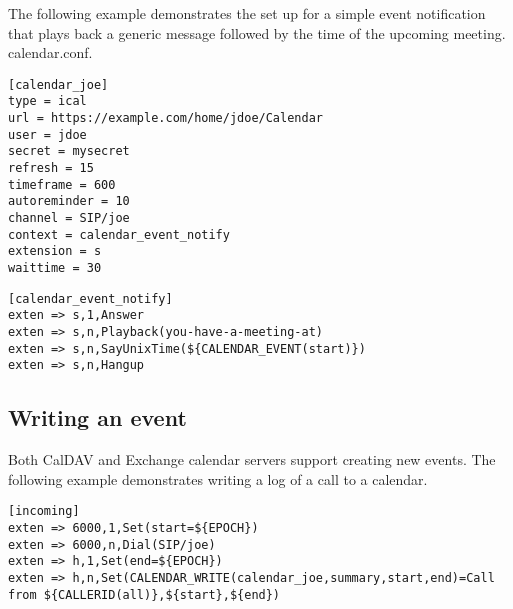 The following example demonstrates the set up for a simple event notification
that plays back a generic message followed by the time of the upcoming meeting.
calendar.conf.
\begin{astlisting}
\begin{verbatim}
[calendar_joe]
type = ical
url = https://example.com/home/jdoe/Calendar
user = jdoe
secret = mysecret
refresh = 15
timeframe = 600
autoreminder = 10
channel = SIP/joe
context = calendar_event_notify
extension = s
waittime = 30
\end{verbatim}
\end{astlisting}

\begin{astlisting}
\begin{verbatim}
[calendar_event_notify]
exten => s,1,Answer
exten => s,n,Playback(you-have-a-meeting-at)
exten => s,n,SayUnixTime(${CALENDAR_EVENT(start)})
exten => s,n,Hangup
\end{verbatim}
\end{astlisting}

\subsection{Writing an event}
Both CalDAV and Exchange calendar servers support creating new events. The
following example demonstrates writing a log of a call to a calendar.
\begin{astlisting}
\begin{verbatim}
[incoming]
exten => 6000,1,Set(start=${EPOCH})
exten => 6000,n,Dial(SIP/joe)
exten => h,1,Set(end=${EPOCH})
exten => h,n,Set(CALENDAR_WRITE(calendar_joe,summary,start,end)=Call from ${CALLERID(all)},${start},${end})
\end{verbatim}
\end{astlisting}
